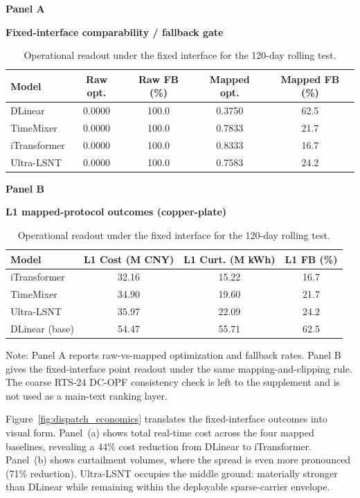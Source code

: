 \documentclass[review,1p,times]{elsarticle}
\newcommand{\aePanelHeading}[2]{%
  \par\vspace{2pt}%
  \noindent\begin{minipage}{\linewidth}
    \centering
    \textbf{#1}\par
    \textbf{#2}\par
  \end{minipage}%
  \par\vspace{2pt}%
}
\newcommand{\aeTableNote}[1]{%
  \par\vspace{2pt}%
  \noindent\begin{minipage}{\linewidth}
    \raggedright\footnotesize
    Note: #1
  \end{minipage}%
  \par
}
\begin{document}
\begin{table}[t]
\centering
\caption{Operational readout under the fixed interface for the 120-day rolling test.}
\label{tab:table5_dispatch_value}
\label{tab:main4_dispatch_value}
\label{tab:dispatch_raw_vs_mapped}
\label{tab:master_dispatch}
\footnotesize
\setlength{\tabcolsep}{4pt}
\aePanelHeading{Panel A}{Fixed-interface comparability / fallback gate}
\begin{tabular*}{0.90\linewidth}{@{\extracolsep{\fill}}lcccc@{}}
\toprule
\textbf{Model} & \textbf{Raw opt.} & \textbf{Raw FB (\%)} & \textbf{Mapped opt.} & \textbf{Mapped FB (\%)} \\
\midrule
DLinear & 0.0000 & 100.0 & 0.3750 & 62.5 \\
TimeMixer & 0.0000 & 100.0 & 0.7833 & 21.7 \\
iTransformer & 0.0000 & 100.0 & 0.8333 & 16.7 \\
Ultra-LSNT & 0.0000 & 100.0 & 0.7583 & 24.2 \\
\bottomrule
\end{tabular*}
\vspace{4pt}
\aePanelHeading{Panel B}{L1 mapped-protocol outcomes (copper-plate)}
\begin{tabular*}{0.86\linewidth}{@{\extracolsep{\fill}}lccc@{}}
\toprule
\textbf{Model} & \textbf{L1 Cost (M CNY)} & \textbf{L1 Curt. (M kWh)} & \textbf{L1 FB (\%)} \\
\midrule
iTransformer & 32.16 & 15.22 & 16.7 \\
TimeMixer & 34.90 & 19.60 & 21.7 \\
Ultra-LSNT & 35.97 & 22.09 & 24.2 \\
DLinear (base) & 54.47 & 55.71 & 62.5 \\
\bottomrule
\end{tabular*}
\aeTableNote{Panel A reports raw-vs-mapped optimization and fallback rates. Panel B gives the fixed-interface point readout under the same mapping-and-clipping rule. The coarse RTS-24 DC-OPF consistency check is left to the supplement and is not used as a main-text ranking layer.}
\end{table}

Figure~\ref{fig:dispatch_economics} translates the fixed-interface outcomes into visual form. Panel~(a) shows total real-time cost across the four mapped baselines, revealing a 44\% cost reduction from DLinear to iTransformer. Panel~(b) shows curtailment volumes, where the spread is even more pronounced (71\% reduction). Ultra-LSNT occupies the middle ground: materially stronger than DLinear while remaining within the deployable sparse-carrier envelope.
\end{document}
